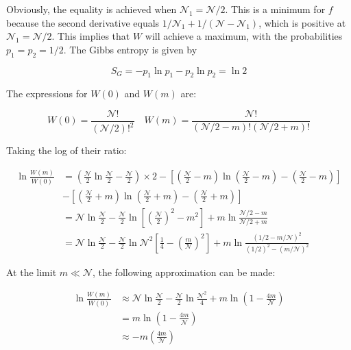 \documentclass[12pt]{article}
\begin{document}
Obviously, the equality is achieved when $\mathcal{N}_{1} = \mathcal{N}/2$. This is a minimum for $f$ because the second derivative equals $1/\mathcal{N}_{1} + 1/(\mathcal{N}-\mathcal{N}_{1})$, which is positive at $\mathcal{N}_{1} = \mathcal{N}/2$. This implies that $W$ will achieve a maximum, with the probabilities $p_{1} = p_{2} = 1/2$. The Gibbs entropy is given by

\begin{equation}
S_{G} = -p_{1} \ln{p_{1}} - p_{2} \ln{p_{2}} = \ln{2}
\end{equation}

The expressions for $W(0)$ and $W(m)$ are:

\begin{equation}
W(0)  = \frac{\mathcal{N}!}{(\mathcal{N}/2)!^{2}} \quad W(m) = \frac{\mathcal{N}!}{(\mathcal{N}/2 - m)!(\mathcal{N}/2 + m)!}
\end{equation}

Taking the log of their ratio:

\begin{equation}
\begin{split}
\ln{\frac{W(m)}{W(0)}} &= (\frac{\mathcal{N}}{2} \ln{\frac{\mathcal{N}}{2}} - \frac{\mathcal{N}}{2}) \times 2 - \left[ (\frac{\mathcal{N}}{2} - m) \ln{(\frac{\mathcal{N}}{2} - m)} - (\frac{\mathcal{N}}{2} - m) \right] \\
                       &- \left[ (\frac{\mathcal{N}}{2} + m) \ln{(\frac{\mathcal{N}}{2} + m)} - (\frac{\mathcal{N}}{2} + m) \right] \\
                       &= \mathcal{N} \ln{\frac{\mathcal{N}}{2}} - \frac{\mathcal{N}}{2} \ln{\left[ (\frac{\mathcal{N}}{2})^{2} - m^{2} \right]} + m \ln{\frac{\mathcal{N}/2 - m}{\mathcal{N}/2 + m}} \\
                       &= \mathcal{N} \ln{\frac{\mathcal{N}}{2}} - \frac{\mathcal{N}}{2} \ln{\mathcal{N}^{2} \left[ \frac{1}{4} - (\frac{m}{\mathcal{N}})^{2} \right]} + m \ln{\frac{(1/2 - m/\mathcal{N})^{2}}{(1/2)^{2} - (m/\mathcal{N})^{2}}}
\end{split}
\end{equation}

At the limit $m \ll \mathcal{N}$, the following approximation can be made:

\begin{equation}
\begin{split}
\ln{\frac{W(m)}{W(0)}} &\approx \mathcal{N} \ln{\frac{\mathcal{N}}{2}} - \frac{\mathcal{N}}{2} \ln{\frac{\mathcal{N}^{2}}{4}} + m \ln{\left( 1 - \frac{4m}{\mathcal{N}} \right)} \\
                       &= m \ln{\left( 1 - \frac{4m}{\mathcal{N}} \right)} \\
                       &\approx -m \left( \frac{4m}{\mathcal{N}} \right)
\end{split}
\end{equation}
\end{document}
